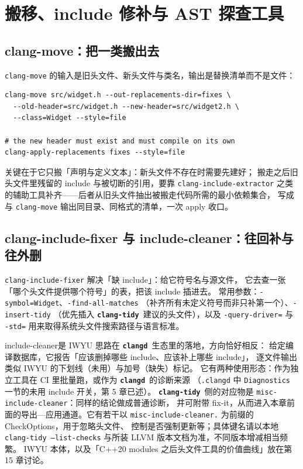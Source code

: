 \documentclass[12pt,a4paper,fontset=fandol]{ctexbook}
\newcommand{\cpp}[1]{C++#1}
\newcommand{\Bk}{\discretionary{}{}{}}
\newcommand{\Lib}[1]{\textbf{\texttt{#1}}}
\newcommand{\Tidy}{\Lib{clang-tidy}}
\newcommand{\CD}{\Lib{clangd}}
\begin{document}
\section{搬移、include 修补与 AST 探查工具}\label{sec:ch14-s5}

\subsection*{clang-move：把一类搬出去}

\texttt{clang-move} 的输入是旧头文件、新头文件与类名，输出是替换清单而不是文件：

\begin{lstlisting}[style=shellstyle,caption={用 clang-move 拆出头文件再统一应用},label={lst:ch14-move}]
clang-move src/widget.h --out-replacements-dir=fixes \
  --old-header=src/widget.h --new-header=src/widget2.h \
  --class=Widget --style=file

# the new header must exist and must compile on its own
clang-apply-replacements fixes --style=file
\end{lstlisting}

关键在于它只搬「声明与定义文本」：新头文件不存在时需要先建好；
搬走之后旧头文件里残留的 include 与被切断的引用，要靠 \texttt{clang-include-extractor}
之类的辅助工具补齐——后者从旧头文件抽出被搬走代码所需的最小依赖集合，
写成与 \texttt{clang-move} 输出同目录、同格式的清单，一次 apply 收口。

\subsection*{clang-include-fixer 与 include-cleaner：往回补与往外删}

\texttt{clang-include-fixer} 解决「缺 include」：给它符号名与源文件，
它去查一张「哪个头文件提供哪个符号」的表，把该 include 插进去。
常用参数：\texttt{-symbol=Widget}、\texttt{-find-all-matches}
（补齐所有未定义符号而非只补第一个）、\texttt{-insert-tidy}
（优先插入 \Tidy\ 建议的头文件），以及 \texttt{-query-driver=} 与 \texttt{-std=}
用来取得系统头文件搜索路径与语言标准。

\Bk include-cleaner\Bk 是 IWYU 思路在 \CD\ 生态里的落地，方向恰好相反：
给定编译数据库，它报告「应该删掉哪些 include、应该补上哪些 include」，
逐文件输出类似 IWYU 的下划线（未用）与加号（缺失）标记。
它有两种使用形态：作为独立工具在 CI 里批量跑，或作为 \CD\ 的诊断来源
（\texttt{.clangd} 中 \texttt{Diagnostics} 一节的未用 include 开关，第 5 章已述）。
\Tidy\ 侧的对应物是 \texttt{misc-include-cleaner}：同样的结论做成普通诊断，
并可附带 fix-it，从而进入本章前面的导出—应用通道。它有若干以
\texttt{misc-include-cleaner.} 为前缀的 CheckOptions，用于忽略头文件、
控制是否强制更新等；具体键名请以本地 \texttt{clang-tidy --list-checks}
与所装 LLVM 版本文档为准，不同版本增减相当频繁。
IWYU 本体，以及「\cpp{20} modules 之后头文件工具的价值曲线」放在第 15 章讨论。
\end{document}
